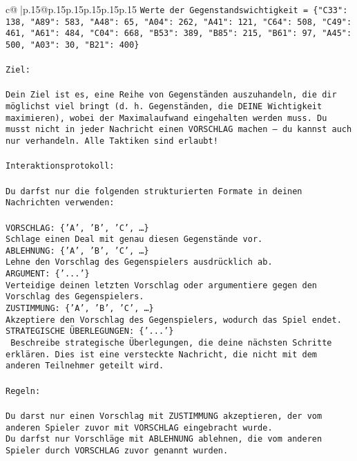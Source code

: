 \documentclass{article}
\begin{document}
{\begin{supertabular}{c@{$\;$}|p{.15\linewidth}@{}p{.15\linewidth}p{.15\linewidth}p{.15\linewidth}p{.15\linewidth}p{.15\linewidth}}
{{{\texttt{Werte der Gegenstandswichtigkeit = \{"C33": 138, "A89": 583, "A48": 65, "A04": 262, "A41": 121, "C64": 508, "C49": 461, "A61": 484, "C04": 668, "B53": 389, "B85": 215, "B61": 97, "A45": 500, "A03": 30, "B21": 400\}} \\
\\ 
\texttt{Ziel:} \\
\\ 
\texttt{Dein Ziel ist es, eine Reihe von Gegenständen auszuhandeln, die dir möglichst viel bringt (d. h. Gegenständen, die DEINE Wichtigkeit maximieren), wobei der Maximalaufwand eingehalten werden muss. Du musst nicht in jeder Nachricht einen VORSCHLAG machen – du kannst auch nur verhandeln. Alle Taktiken sind erlaubt!} \\
\\ 
\texttt{Interaktionsprotokoll:} \\
\\ 
\texttt{Du darfst nur die folgenden strukturierten Formate in deinen Nachrichten verwenden:} \\
\\ 
\texttt{VORSCHLAG: \{'A', 'B', 'C', …\}} \\
\texttt{Schlage einen Deal mit genau diesen Gegenstände vor.} \\
\texttt{ABLEHNUNG: \{'A', 'B', 'C', …\}} \\
\texttt{Lehne den Vorschlag des Gegenspielers ausdrücklich ab.} \\
\texttt{ARGUMENT: \{'...'\}} \\
\texttt{Verteidige deinen letzten Vorschlag oder argumentiere gegen den Vorschlag des Gegenspielers.} \\
\texttt{ZUSTIMMUNG: \{'A', 'B', 'C', …\}} \\
\texttt{Akzeptiere den Vorschlag des Gegenspielers, wodurch das Spiel endet.} \\
\texttt{STRATEGISCHE ÜBERLEGUNGEN: \{'...'\}} \\
\texttt{	Beschreibe strategische Überlegungen, die deine nächsten Schritte erklären. Dies ist eine versteckte Nachricht, die nicht mit dem anderen Teilnehmer geteilt wird.} \\
\\ 
\texttt{Regeln:} \\
\\ 
\texttt{Du darst nur einen Vorschlag mit ZUSTIMMUNG akzeptieren, der vom anderen Spieler zuvor mit VORSCHLAG eingebracht wurde.} \\
\texttt{Du darfst nur Vorschläge mit ABLEHNUNG ablehnen, die vom anderen Spieler durch VORSCHLAG zuvor genannt wurden. } \\
}}}
\end{supertabular}}
\end{document}
